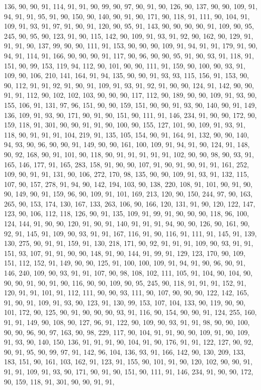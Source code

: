 \begin{sloppypar}
136, 90, 90, 91, 114, 91, 91, 90, 99, 90, 97, 90, 91, 90, 126, 90, 137, 90, 90, 109, 91, 94, 91, 91, 95, 91, 90, 150, 90, 140, 90, 91, 90, 171, 90, 118, 91, 111, 90, 104, 91, 109, 91, 93, 91, 97, 91, 90, 91, 120, 90, 95, 91, 143, 90, 90, 90, 90, 91, 109, 90, 95, 245, 90, 95, 90, 123, 91, 90, 115, 142, 90, 109, 91, 93, 91, 92, 90, 162, 90, 129, 91, 91, 91, 90, 137, 99, 90, 90, 111, 91, 153, 90, 90, 90, 109, 91, 94, 91, 91, 179, 91, 90, 94, 91, 114, 91, 166, 90, 90, 90, 91, 117, 90, 96, 90, 90, 95, 91, 90, 93, 91, 118, 91, 151, 90, 99, 153, 119, 94, 112, 90, 101, 90, 90, 111, 91, 159, 90, 100, 90, 93, 91, 109, 90, 106, 210, 141, 164, 91, 94, 135, 90, 90, 91, 93, 93, 115, 156, 91, 153, 90, 90, 112, 91, 91, 92, 91, 90, 91, 109, 91, 93, 91, 92, 91, 90, 90, 124, 91, 142, 90, 90, 91, 91, 112, 90, 102, 102, 103, 90, 90, 90, 117, 112, 90, 189, 90, 90, 109, 91, 93, 90, 155, 106, 91, 131, 97, 96, 151, 90, 90, 159, 151, 90, 90, 91, 93, 90, 140, 90, 91, 149, 136, 109, 91, 93, 90, 171, 90, 91, 90, 151, 90, 111, 91, 146, 234, 91, 90, 90, 172, 90, 159, 118, 91, 301, 90, 90, 91, 91, 90, 100, 90, 155, 127, 101, 90, 109, 91, 93, 91, 118, 90, 91, 91, 91, 104, 219, 91, 135, 105, 154, 90, 91, 164, 91, 132, 90, 90, 140, 94, 93, 90, 96, 90, 90, 91, 149, 90, 90, 161, 100, 109, 91, 94, 91, 90, 124, 91, 148, 90, 92, 168, 90, 91, 101, 90, 118, 90, 91, 91, 91, 91, 91, 102, 90, 90, 98, 90, 93, 91, 165, 146, 177, 91, 165, 283, 158, 91, 90, 90, 107, 91, 90, 91, 90, 91, 91, 161, 252, 109, 90, 91, 91, 131, 90, 106, 272, 170, 98, 135, 90, 90, 109, 91, 93, 91, 132, 115, 107, 90, 157, 278, 91, 94, 90, 142, 194, 103, 90, 138, 220, 108, 91, 101, 90, 91, 90, 90, 149, 90, 91, 159, 96, 90, 109, 91, 101, 169, 213, 120, 90, 150, 244, 97, 90, 163, 265, 90, 153, 174, 130, 167, 133, 263, 106, 90, 166, 120, 131, 91, 90, 120, 122, 147, 123, 90, 106, 112, 118, 126, 90, 91, 135, 109, 91, 99, 91, 90, 90, 90, 118, 96, 100, 124, 144, 91, 90, 90, 120, 91, 90, 91, 140, 91, 91, 91, 94, 90, 90, 126, 90, 161, 90, 92, 91, 145, 91, 109, 90, 93, 91, 91, 167, 116, 91, 90, 116, 91, 111, 91, 145, 91, 139, 130, 275, 90, 91, 91, 159, 91, 130, 218, 171, 90, 92, 91, 91, 91, 109, 90, 93, 91, 91, 151, 93, 107, 91, 91, 90, 90, 148, 91, 90, 144, 91, 99, 91, 129, 123, 170, 90, 109, 151, 112, 152, 91, 149, 90, 90, 125, 91, 100, 100, 109, 91, 94, 91, 90, 96, 90, 91, 146, 240, 109, 90, 93, 91, 91, 107, 90, 98, 108, 102, 111, 105, 91, 104, 90, 104, 90, 90, 90, 91, 90, 91, 90, 116, 90, 90, 109, 90, 95, 245, 90, 118, 91, 91, 91, 152, 91, 120, 91, 91, 101, 91, 112, 111, 90, 90, 93, 111, 90, 107, 90, 90, 90, 122, 142, 165, 91, 90, 91, 109, 91, 93, 90, 123, 91, 130, 99, 153, 107, 104, 133, 90, 119, 90, 90, 101, 172, 90, 125, 90, 91, 90, 90, 90, 93, 91, 116, 90, 154, 90, 90, 91, 124, 255, 160, 91, 91, 149, 90, 108, 90, 127, 96, 91, 122, 90, 109, 90, 93, 91, 91, 98, 90, 90, 100, 90, 90, 96, 90, 97, 163, 90, 98, 229, 117, 90, 104, 91, 91, 90, 90, 109, 91, 90, 109, 91, 93, 90, 140, 150, 136, 91, 91, 91, 90, 104, 91, 90, 176, 91, 91, 122, 127, 90, 92, 90, 91, 95, 90, 99, 97, 91, 142, 96, 104, 136, 93, 91, 166, 142, 90, 130, 209, 133, 183, 151, 90, 161, 103, 162, 91, 123, 91, 155, 90, 101, 91, 90, 120, 102, 90, 90, 91, 91, 91, 109, 91, 93, 90, 171, 90, 91, 90, 151, 90, 111, 91, 146, 234, 91, 90, 90, 172, 90, 159, 118, 91, 301, 90, 90, 91, 91, 
\end{sloppypar}
